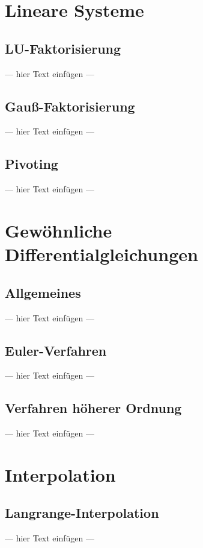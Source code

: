 \documentclass[a4paper, 12pt]{article}
\begin{document}
\section{Lineare Systeme}


\subsection{LU-Faktorisierung}
--- hier Text einfügen ---


\subsection{Gauß-Faktorisierung}
--- hier Text einfügen ---


\subsection{Pivoting}
--- hier Text einfügen ---



\section{Gewöhnliche Differentialgleichungen}


\subsection{Allgemeines}
--- hier Text einfügen ---


\subsection{Euler-Verfahren}
--- hier Text einfügen ---


\subsection{Verfahren höherer Ordnung}
--- hier Text einfügen ---



\section{Interpolation}


\subsection{Langrange-Interpolation}
--- hier Text einfügen ---
\end{document}
